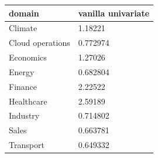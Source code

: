 \begin{tabular}{ll}
\toprule
domain & vanilla univariate \\
\midrule
Climate & 1.18221 \\
Cloud operations & 0.772974 \\
Economics & 1.27026 \\
Energy & 0.682804 \\
Finance & 2.22522 \\
Healthcare & 2.59189 \\
Industry & 0.714802 \\
Sales & 0.663781 \\
Transport & 0.649332 \\
\bottomrule
\end{tabular}
